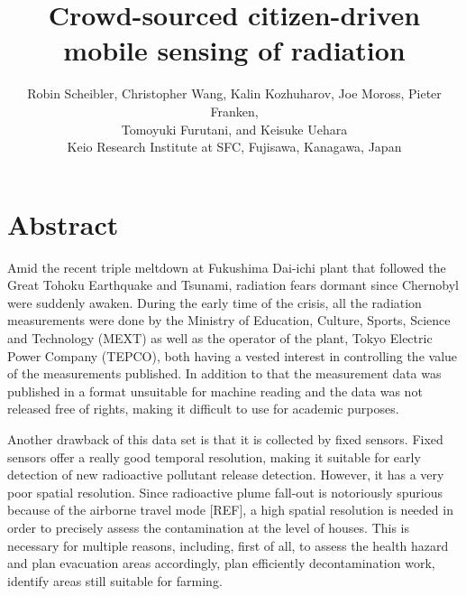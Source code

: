 \documentclass[11pt]{article}
\newcommand*{\TitleFont}{%
  \Large\usefont{T1}{phv}{b}{n}%
    \selectfont}
\newcommand*{\AuthorFont}{%
  \normalsize\usefont{T1}{\rmdefault}{m}{n}%
    \selectfont}
\begin{document}
%
\title{\TitleFont Crowd-sourced citizen-driven mobile sensing of radiation}



\author{
  \AuthorFont Robin Scheibler, Christopher Wang, Kalin Kozhuharov, Joe Moross, Pieter Franken, \\
  \AuthorFont Tomoyuki Furutani, and Keisuke Uehara \\
  \AuthorFont Keio Research Institute at SFC, Fujisawa, Kanagawa, Japan
}

\date{}

\maketitle

\thispagestyle{empty}
\pagestyle{empty}

\section*{Abstract}
\label{sec:abstract}

Amid the recent triple meltdown at Fukushima Dai-ichi plant that followed the Great Tohoku Earthquake and Tsunami, radiation fears dormant since Chernobyl were suddenly awaken.
During the early time of the crisis, all the radiation measurements were done by the Ministry of Education, Culture, Sports, Science and Technology (MEXT) as 
well as the operator of the plant, Tokyo Electric Power Company (TEPCO), both having a vested interest in controlling the value of the measurements published.
In addition to that the measurement data was published in a format unsuitable for machine reading and the data was not released free of rights,
making it difficult to use for academic purposes.

Another drawback of this data set is that it is collected by fixed sensors. Fixed sensors offer a really good temporal resolution, making it suitable for
early detection of new radioactive pollutant release detection. However, it has a very poor spatial resolution. Since radioactive plume fall-out is notoriously
spurious because of the airborne travel mode [REF], a high spatial resolution is needed in order to precisely assess the contamination at the level of houses.
This is necessary for multiple reasons, including, first of all, to assess the health hazard and plan evacuation areas accordingly, plan efficiently decontamination
work, identify areas still suitable for farming.
\end{document}
